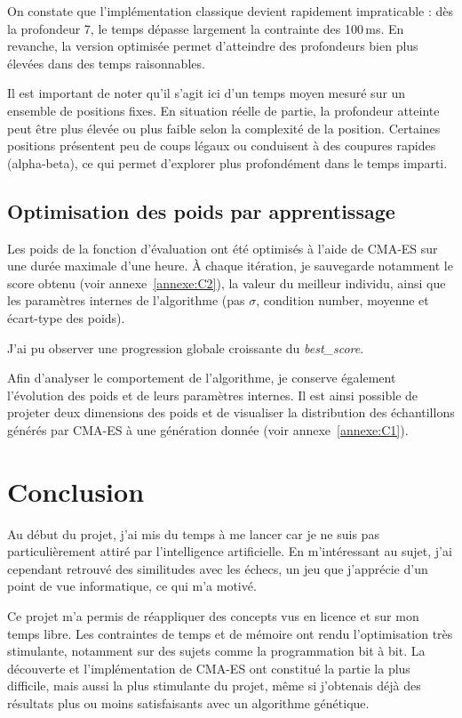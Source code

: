 \documentclass[11pt,a4paper]{article}
\begin{document}
On constate que l'implémentation classique devient rapidement impraticable : dès la profondeur 7, le temps dépasse largement la
contrainte des 100\,ms. En revanche, la version optimisée permet d'atteindre des profondeurs bien plus élevées dans des temps
raisonnables.

Il est important de noter qu'il s'agit ici d'un temps moyen mesuré sur un ensemble de positions fixes. En situation réelle de partie,
la profondeur atteinte peut être plus élevée ou plus faible selon la complexité de la position. Certaines positions présentent peu de
coups légaux ou conduisent à des coupures rapides (alpha-beta), ce qui permet d'explorer plus profondément dans le temps imparti.

\subsection{Optimisation des poids par apprentissage}

Les poids de la fonction d'évaluation ont été optimisés à l'aide de CMA-ES sur une durée maximale d'une heure. À chaque itération, je
sauvegarde notamment le score obtenu (voir annexe~\ref{annexe:C2}), la valeur du meilleur individu, ainsi que les paramètres internes de l'algorithme
(pas $\sigma$, condition number, moyenne et écart-type des poids).

J’ai pu observer une progression globale croissante du \textit{best\_score}.

Afin d'analyser le comportement de l'algorithme, je conserve également l'évolution des poids et de leurs paramètres internes. Il est
ainsi possible de projeter deux dimensions des poids et de visualiser la distribution des échantillons générés par CMA-ES à une génération
donnée (voir annexe~\ref{annexe:C1}).


\section{Conclusion}

Au début du projet, j'ai mis du temps à me lancer car je ne suis pas particulièrement attiré par l'intelligence artificielle. En
m'intéressant au sujet, j'ai cependant retrouvé des similitudes avec les échecs, un jeu que j'apprécie d'un point de vue informatique,
ce qui m'a motivé.

Ce projet m'a permis de réappliquer des concepts vus en licence et sur mon temps libre. Les contraintes de temps et de mémoire ont
rendu l'optimisation très stimulante, notamment sur des sujets comme la programmation bit à bit. La découverte et l'implémentation
de CMA-ES ont constitué la partie la plus difficile, mais aussi la plus stimulante du projet, même si j'obtenais déjà des résultats plus ou moins
satisfaisants avec un algorithme génétique.
\end{document}
